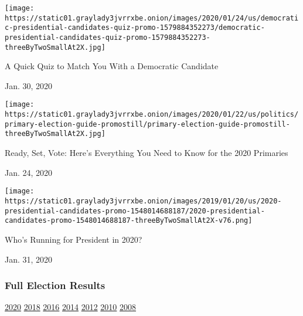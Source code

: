 \texttt{[image: https://static01.graylady3jvrrxbe.onion/images/2020/01/24/us/democratic-presidential-candidates-quiz-promo-1579884352273/democratic-presidential-candidates-quiz-promo-1579884352273-threeByTwoSmallAt2X.jpg]}

A Quick Quiz to Match You With a Democratic Candidate

Jan. 30, 2020

\href{https://www.nytimes3xbfgragh.onion/interactive/2020/01/24/us/politics/presidential-primary-election-guide.html?action=click\&module=ELEX_results\&pgtype=Interactive\&region=RelatedCoverage}{}

\texttt{[image: https://static01.graylady3jvrrxbe.onion/images/2020/01/22/us/politics/primary-election-guide-promostill/primary-election-guide-promostill-threeByTwoSmallAt2X.jpg]}

Ready, Set, Vote: Here's Everything You Need to Know for the 2020
Primaries

Jan. 24, 2020

\href{https://www.nytimes3xbfgragh.onion/interactive/2019/us/politics/2020-presidential-candidates.html?action=click\&module=ELEX_results\&pgtype=Interactive\&region=RelatedCoverage}{}

\texttt{[image: https://static01.graylady3jvrrxbe.onion/images/2019/01/20/us/2020-presidential-candidates-promo-1548014688187/2020-presidential-candidates-promo-1548014688187-threeByTwoSmallAt2X-v76.png]}

Who's Running for President in 2020?

Jan. 31, 2020

\hypertarget{full-election-results}{%
\subsubsection{Full Election Results}\label{full-election-results}}

\href{https://www.nytimes3xbfgragh.onion/interactive/2020/us/elections/delegate-count-primary-results.html?action=click\&module=ELEX_results\&pgtype=Interactive\&region=PastResultsFooter}{2020}
\href{https://www.nytimes3xbfgragh.onion/interactive/2018/us/elections/calendar-primary-results.html?action=click\&module=ELEX_results\&pgtype=Interactive\&region=PastResultsFooter}{2018}
\href{https://www.nytimes3xbfgragh.onion/elections/2016/results/president?action=click\&module=ELEX_results\&pgtype=Interactive\&region=PastResultsFooter}{2016}
\href{https://www.nytimes3xbfgragh.onion/elections/2014/results/senate?action=click\&module=ELEX_results\&pgtype=Interactive\&region=PastResultsFooter}{2014}
\href{https://www.nytimes3xbfgragh.onion/elections/2012/results/president.html?action=click\&module=ELEX_results\&pgtype=Interactive\&region=PastResultsFooter}{2012}
\href{https://www.nytimes3xbfgragh.onion/elections/2010/results/senate.html?action=click\&module=ELEX_results\&pgtype=Interactive\&region=PastResultsFooter}{2010}
\href{https://www.nytimes3xbfgragh.onion/elections/2008/results/president/map.html?action=click\&module=ELEX_results\&pgtype=Interactive\&region=PastResultsFooter}{2008}

